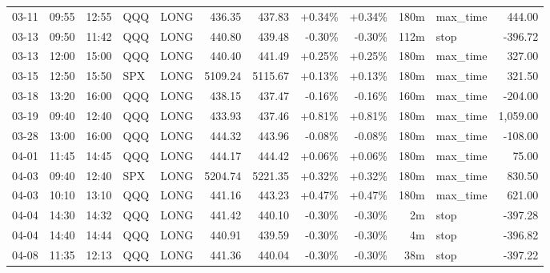 \documentclass[11pt,a4paper]{article}
\begin{document}
\begin{center}
\begin{longtable}{>{\color{txtmain}}l l l l l r r r r r >{\color{txtmain}}l r}
03-11 & 09:55 & 12:55 & QQQ & LONG & 436.35 & 437.83 & \textcolor{wingreen}{+0.34\%} & \textcolor{wingreen}{+0.34\%} & 180m & max\_time & \textcolor{wingreen}{444.00} \\
03-13 & 09:50 & 11:42 & QQQ & LONG & 440.80 & 439.48 & \textcolor{lossred}{-0.30\%} & \textcolor{lossred}{-0.30\%} & 112m & stop & \textcolor{lossred}{-396.72} \\
03-13 & 12:00 & 15:00 & QQQ & LONG & 440.40 & 441.49 & \textcolor{wingreen}{+0.25\%} & \textcolor{wingreen}{+0.25\%} & 180m & max\_time & \textcolor{wingreen}{327.00} \\
03-15 & 12:50 & 15:50 & SPX & LONG & 5109.24 & 5115.67 & \textcolor{wingreen}{+0.13\%} & \textcolor{wingreen}{+0.13\%} & 180m & max\_time & \textcolor{wingreen}{321.50} \\
03-18 & 13:20 & 16:00 & QQQ & LONG & 438.15 & 437.47 & \textcolor{lossred}{-0.16\%} & \textcolor{lossred}{-0.16\%} & 160m & max\_time & \textcolor{lossred}{-204.00} \\
03-19 & 09:40 & 12:40 & QQQ & LONG & 433.93 & 437.46 & \textcolor{wingreen}{+0.81\%} & \textcolor{wingreen}{+0.81\%} & 180m & max\_time & \textcolor{wingreen}{1,059.00} \\
03-28 & 13:00 & 16:00 & QQQ & LONG & 444.32 & 443.96 & \textcolor{lossred}{-0.08\%} & \textcolor{lossred}{-0.08\%} & 180m & max\_time & \textcolor{lossred}{-108.00} \\
04-01 & 11:45 & 14:45 & QQQ & LONG & 444.17 & 444.42 & \textcolor{wingreen}{+0.06\%} & \textcolor{wingreen}{+0.06\%} & 180m & max\_time & \textcolor{wingreen}{75.00} \\
04-03 & 09:40 & 12:40 & SPX & LONG & 5204.74 & 5221.35 & \textcolor{wingreen}{+0.32\%} & \textcolor{wingreen}{+0.32\%} & 180m & max\_time & \textcolor{wingreen}{830.50} \\
04-03 & 10:10 & 13:10 & QQQ & LONG & 441.16 & 443.23 & \textcolor{wingreen}{+0.47\%} & \textcolor{wingreen}{+0.47\%} & 180m & max\_time & \textcolor{wingreen}{621.00} \\
04-04 & 14:30 & 14:32 & QQQ & LONG & 441.42 & 440.10 & \textcolor{lossred}{-0.30\%} & \textcolor{lossred}{-0.30\%} & 2m & stop & \textcolor{lossred}{-397.28} \\
04-04 & 14:40 & 14:44 & QQQ & LONG & 440.91 & 439.59 & \textcolor{lossred}{-0.30\%} & \textcolor{lossred}{-0.30\%} & 4m & stop & \textcolor{lossred}{-396.82} \\
04-08 & 11:35 & 12:13 & QQQ & LONG & 441.36 & 440.04 & \textcolor{lossred}{-0.30\%} & \textcolor{lossred}{-0.30\%} & 38m & stop & \textcolor{lossred}{-397.22} \\

\end{longtable}
\end{center}
\end{document}
